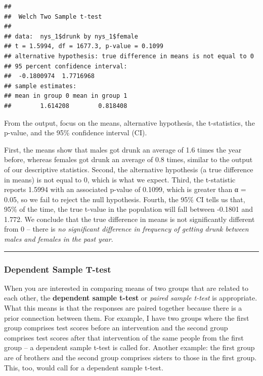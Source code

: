 \documentclass[
]{book}
\begin{document}
\begin{verbatim}
## 
##  Welch Two Sample t-test
## 
## data:  nys_1$drunk by nys_1$female
## t = 1.5994, df = 1677.3, p-value = 0.1099
## alternative hypothesis: true difference in means is not equal to 0
## 95 percent confidence interval:
##  -0.1800974  1.7716968
## sample estimates:
## mean in group 0 mean in group 1 
##        1.614208        0.818408
\end{verbatim}

From the output, focus on the means, alternative hypothesis, the t-statistics, the p-value, and the 95\% confidence interval (CI).

First, the means show that males got drunk an average of 1.6 times the year before, whereas females got drunk an average of 0.8 times, similar to the output of our descriptive statistics. Second, the alternative hypothesis (a true difference in means) is not equal to 0, which is what we expect. Third, the t-statistic reports 1.5994 with an associated p-value of 0.1099, which is greater than α = 0.05, so we fail to reject the null hypothesis. Fourth, the 95\% CI tells us that, 95\% of the time, the true t-value in the population will fall between -0.1801 and 1.772. We conclude that the true difference in means is not significantly different from 0 -- there is \emph{no significant difference in frequency of getting drunk between males and females in the past year}.

\begin{center}\rule{0.5\linewidth}{0.5pt}\end{center}

\hypertarget{dependent-sample-t-test}{%
\subsubsection{Dependent Sample T-test}\label{dependent-sample-t-test}}

When you are interested in comparing means of two groups that are related to each other, the \textbf{dependent sample t-test} or \emph{paired sample t-test} is appropriate. What this means is that the responses are paired together because there is a prior connection between them. For example, I have two groups where the first group comprises test scores before an intervention and the second group comprises test scores after that intervention of the same people from the first group -- a dependent sample t-test is called for. Another example: the first group are of brothers and the second group comprises sisters to those in the first group. This, too, would call for a dependent sample t-test.
\end{document}
